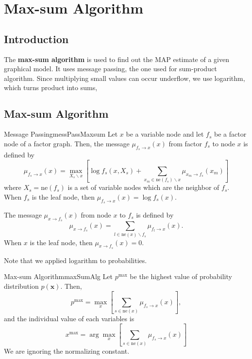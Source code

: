 \documentclass{article}
\begin{document}
\section{Max-sum Algorithm}
    \subsection{Introduction}
        The \textbf{max-sum algorithm} is used to find out the MAP estimate of a given
        graphical model. It uses message passing, the one used for sum-product algorithm.
        Since multiplying small values can occur underflow, we use logarithm, which turns product into sums,
    \subsection{Max-sum Algorithm}
        \begin{defn}{Message Passing}{messPassMaxsum}
            Let $x$ be a variable node and let $f_s$ be a factor node of a factor graph.
            Then, the message $\mu_{f_s \to x}(x)$ from factor $f_s$ to node $x$ is defined by
            \[
                    \mu_{f_s \to x}(x)=\max_{X_s \backslash x}\left[\log f_s(x, X_s) + \sum_{x_m \in \text{ne}(f_s) \backslash x}\mu_{x_m \to f_s}(x_m)\right]
            \]
            where $X_s=\text{ne}(f_s)$ is a set of variable nodes which are the neighbor of $f_s$.
            When $f_s$ is the leaf node, then $\mu_{f_s \to x}(x) = \log f_s(x)$.
            
            The message $\mu_{x \to f_s}(x)$ from node $x$ to $f_s$ is defined by
            \[
            \mu_{x \to f_s}(x)=\sum_{l \in \text{ne}(x) \backslash f_s} \mu_{f_l \to x}(x).
            \]
            When $x$ is the leaf node, then $\mu_{x \to f_s}(x) = 0$.
        \end{defn}
        Note that we applied logarithm to probabilities. 

        \begin{thm}{Max-sum Algorithm}{maxSumAlg}
            Let $p^{\max}$ be the highest value of probability distribution $p(\textbf{x})$. Then,
            \[
            p^{\max}=\max_{x}\left[\sum_{s \in \text{ne}(x)}\mu_{f_s \to x}(x)\right],
            \]
            and the individual value of each variables is
            \[
            x^{\max}=\arg \max_{x}\left[\sum_{s \in \text{ne}(x)}\mu_{f_s \to x}(x)\right]
            \]
            We are ignoring the normalizing constant.
        \end{thm}
\end{document}
